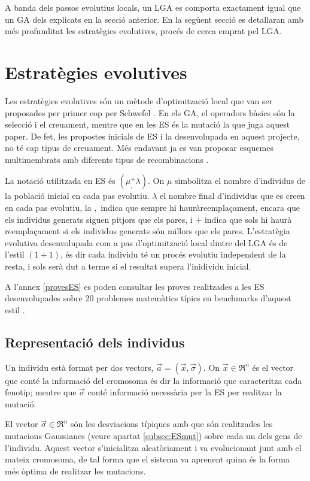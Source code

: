 \documentclass[titlepage,a4paper,12pt]{book}
\begin{document}
A banda dels passos evolutius locals, un LGA es comporta exactament igual que un
GA dels explicats en la secció anterior. En la següent secció es detallaran amb
més profunditat les estratègies evolutives, procés de cerca emprat pel LGA.

\section{Estratègies evolutives} Les estratègies evolutives són un mètode
d'optimització local que van ser proposades per primer cop per Schwefel
\cite{Schwefel:1965}.  En els GA, el operadors bàsics són la selecció i el
creuament, mentre que en les ES és la mutació la que juga aquest paper.  De fet,
les propostes inicials de ES i la desenvolupada en aquest projecte, no té cap
tipus de creuament. Més endavant ja es van proposar esquemes multimembrats amb
diferents tipus de recombinacions \cite{37}.

La notació utilitzada en  ES és $(\mu _,^+ \lambda)$.  On $\mu$ simbolitza el
nombre d'individus de la població inicial en cada pas evolutiu. $\lambda$ el
nombre final d'individus que es creen en cada pas evolutiu, la $,$ indica que
sempre hi hauràreemplaçament, encara que els individus generats siguen pitjors
que els pares, i $+$ indica que sols hi haurà reemplaçament si els individus
generats són millors que els pares. L'estratègia evolutiva desenvolupada com a
pas d'optimització local dintre del LGA és de l'estil $(1+1)$, és dir cada
individu té un procés evolutiu independent de la resta, i sols serà dut a terme
si el resultat supera l'inidividu inicial.

A l'annex \ref{provesES} es poden consultar les proves realitzades a les ES
desenvolupades sobre 20 problemes matemàtics típics en benchmarks d'aquest estil
\cite{YL97}.

\subsection{Representació dels individus\label{subsec:representacio}} Un
individu està format per dos vectors, $\vec{a}=(\vec{x},\vec{\sigma})$. On
$\vec{x} \in \Re^n$ és el vector que conté la informació del cromosoma és dir la
informació que caracteritza cada fenotip; mentre que $\vec{\sigma}$ conté
informació necessària per la ES per realitzar la mutació.

El vector $\vec{\sigma} \in \Re^n$ són les desviacions típiques amb que són
realitzades les mutacions Gaussianes (veure apartat \ref{subsec:ESmut}) sobre
cada un dels gens de l'individu. Aquest vector s'inicialitza aleatòriament i va
evolucionant junt amb el mateix cromosoma, de tal forma que el sistema va
aprenent quina és la forma més òptima de realitzar les mutacions.
\end{document}
